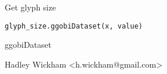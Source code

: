\documentclass{article}
\begin{document}
\begin{Description}\relax
Get glyph size
\end{Description}
\begin{Usage}
\begin{verbatim}glyph_size.ggobiDataset(x, value)\end{verbatim}
\end{Usage}
\begin{Arguments}
\begin{ldescription}
\item[\code{x}] ggobiDataset
\item[\code{value}] 
\end{ldescription}
\end{Arguments}
\begin{Details}\relax
\end{Details}
\begin{Author}\relax
Hadley Wickham <h.wickham@gmail.com>
\end{Author}
\begin{SeeAlso}\relax
{}
\end{SeeAlso}
\begin{Examples}
\begin{ExampleCode}\end{ExampleCode}
\end{Examples}
\end{document}
